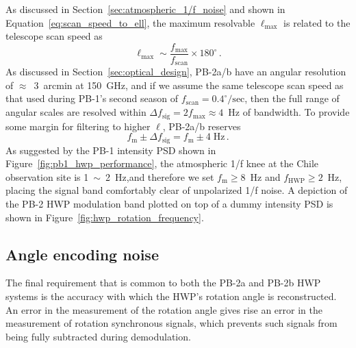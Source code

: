 As discussed in Section~\ref{sec:atmospheric_1/f_noise} and shown in Equation~\ref{eq:scan_speed_to_ell}, the maximum resolvable $\ell_{\mathrm{max}}$ is related to the telescope scan speed as
\begin{equation}
    \ell_{\mathrm{max}} \sim \frac{f_{\mathrm{max}}}{f_{\mathrm{scan}}} \times 180^{\circ} \, .
    \label{eq:maximum_ell_to_modulation_bandwidth}
\end{equation}
As discussed in Section~\ref{sec:optical_design}, PB-2a/b have an angular resolution of $\approx$~3~arcmin at 150~GHz, and if we assume the same telescope scan speed as that used during PB-1's second season of $f_{\mathrm{scan}} = 0.4^{\circ}/\mathrm{sec}$, then the full range of angular scales are resolved within $\Delta f_{\mathrm{sig}} = 2 f_{\mathrm{max}} \approx 4$~Hz of bandwidth. To provide some margin for filtering to higher $\ell$, PB-2a/b reserves 
\begin{equation}
    f_{\mathrm{m}} \pm \Delta f_{\mathrm{sig}} = f_{\mathrm{m}} \pm 4 \; \mathrm{Hz} \, .
\end{equation}
As suggested by the PB-1 intensity PSD shown in Figure~\ref{fig:pb1_hwp_performance}, the atmospheric 1/f knee at the Chile observation site is 1~$\sim$~2~Hz,and therefore we set $f_{\mathrm{m}} \geq 8$~Hz and $f_{\mathrm{HWP}} \geq 2$~Hz, placing the signal band comfortably clear of unpolarized 1/f noise. A depiction of the PB-2 HWP modulation band plotted on top of a dummy intensity PSD is shown in Figure~\ref{fig:hwp_rotation_frequency}.


\subsection{Angle encoding noise}
\label{sec:angle_encoding_noise_requirement}

The final requirement that is common to both the PB-2a and PB-2b HWP systems is the accuracy with which the HWP's rotation angle is reconstructed. An error in the measurement of the rotation angle gives rise an error in the measurement of rotation synchronous signals, which prevents such signals from being fully subtracted during demodulation. 

